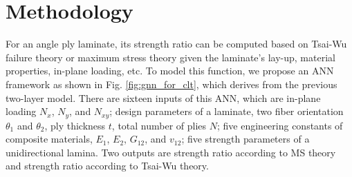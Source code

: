 \documentclass[letterpaper]{IEEEtran}
\begin{document}
\section{Methodology}
For an angle ply laminate, its strength ratio can be computed based on Tsai-Wu
failure theory or maximum stress theory given the laminate's lay-up, material properties,
in-plane loading, etc. To model this function, we propose an
ANN framework as shown in Fig. \ref{fig:gnn_for_clt}, which derives from the previous
two-layer model. There are sixteen inputs of this ANN, which are in-plane
loading $N_x$, $N_y$, and $N_{xy}$; design parameters of a laminate, two 
fiber orientation $\theta_1$ and $\theta_2$, ply thickness $t$, total
number of plies $N$; 
five engineering constants of composite materials,
$E_1$, $E_2$, $G_{12}$, and $v_{12}$; five strength parameters of a
unidirectional lamina.  Two outputs are strength ratio according to MS theory
and strength ratio according to Tsai-Wu theory.
\end{document}

